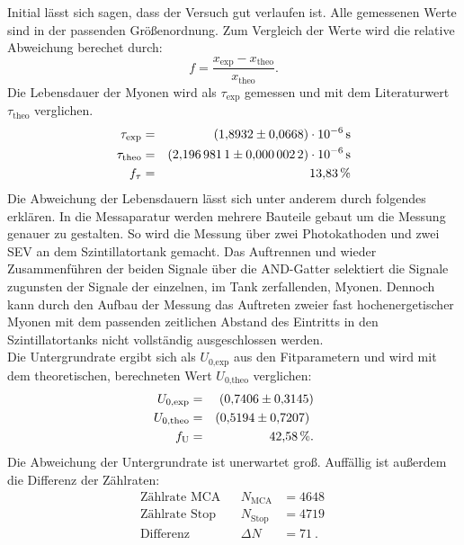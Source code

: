 Initial lässt sich sagen, dass der Versuch gut verlaufen ist.
Alle gemessenen Werte sind in der passenden Größenordnung.
Zum Vergleich der Werte wird die relative Abweichung berechet durch:
\begin{equation*}
  f=\frac{x_{\text{exp}}-x_{\text{theo}}}{x_{\text{theo}}}.
\end{equation*}
Die Lebensdauer der Myonen wird als $\tau_{\text{exp}}$ gemessen und mit dem Literaturwert $\tau_{\text{theo}}$ \cite{PDG} verglichen.
\begin{align*}
  \tau_{\text{exp}}   &=&   \SI{1.8932 \pm 0.0668 e-06}{s}  \\
  \tau_{\text{theo}}  &=&   \SI{2.1969811 \pm 0.0000022 e-06}{s}   \\
  f_{\tau}            &=&   \SI{13.83}{\%}      \\
\end{align*}
Die Abweichung der Lebensdauern lässt sich unter anderem durch folgendes erklären.
In die Messaparatur werden mehrere Bauteile gebaut um die Messung genauer zu gestalten.
So wird die Messung über zwei Photokathoden und zwei SEV an dem Szintillatortank gemacht.
Das Auftrennen und wieder Zusammenführen der beiden Signale über die AND-Gatter selektiert die Signale zugunsten der Signale der einzelnen, im Tank zerfallenden, Myonen.
Dennoch kann durch den Aufbau der Messung das Auftreten zweier fast hochenergetischer Myonen mit dem passenden zeitlichen Abstand des Eintritts in den Szintillatortanks nicht vollständig ausgeschlossen werden.\\
Die Untergrundrate ergibt sich als $U_{\text{0,exp}}$ aus den Fitparametern und wird mit dem theoretischen, berechneten Wert $U_{\text{0,theo}}$ verglichen:
\begin{align*}
  U_{\text{0,exp}}    &=&  \SI{0.7406 \pm 0.3145}{} \\
  U_{\text{0,theo}}   &=&  \SI{0.5194 \pm 0.7207}{}   \\
  f_{\text{U}}        &=&  \SI{42.58}{\%}. \\
\end{align*}
Die Abweichung der Untergrundrate ist unerwartet groß.
Auffällig ist außerdem die Differenz der Zählraten:
\begin{align*}
  \text{Zählrate MCA}      && N_{\text{MCA}}    &=\SI{4648}{} \\
  \text{Zählrate Stop}     && N_{\text{Stop}}   &=\SI{4719}{} \\
  \text{Differenz}         && \Delta N          &=\SI{71}{}.\\
\end{align*}
